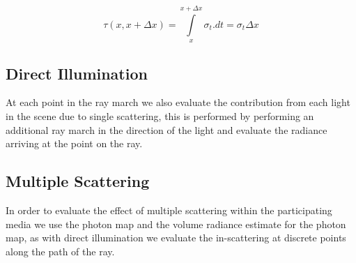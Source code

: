 \begin{equation*}
	\tau(x, x + \Delta x) = \int\limits_x^{x + \Delta x} \sigma_t .  dt = \sigma_t \Delta x
\label{eq:homo-attem}
\end{equation*}

\subsection{Direct Illumination}
At each point in the ray march we also evaluate the contribution from each light in the scene due to single scattering, this is performed
by performing an additional ray march in the direction of the light and evaluate the radiance arriving at the point on the ray.

\subsection{Multiple Scattering}
In order to evaluate the effect of multiple scattering within the participating media we use the photon map and the volume radiance estimate
for the photon map, as with direct illumination we evaluate the in-scattering at discrete points along the path of the ray.
